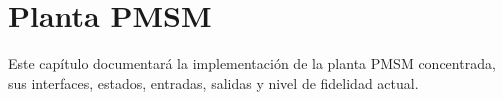 \section{Planta PMSM}

Este capítulo documentará la implementación de la planta PMSM concentrada, sus interfaces, estados, entradas, salidas y nivel de fidelidad actual.
